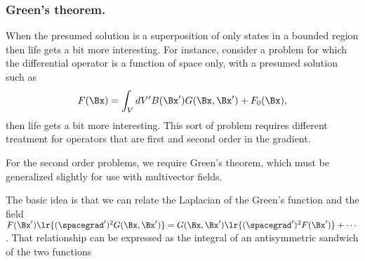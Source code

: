 \subsubsection{Green's theorem.}

When the presumed solution is a superposition of only states in a bounded region
then life gets a bit more interesting.  For instance, consider a problem for which the differential operator is a function of space only, with a presumed solution such as
\begin{equation}\label{eqn:greensFunctionSolutions:200}
F(\Bx) = \int_V dV' B(\Bx') G(\Bx, \Bx') + F_0(\Bx),
\end{equation}
then life gets a bit more interesting.
This sort of problem requires different treatment for operators that are first and second order in the gradient.

For the second order problems, we require Green's theorem, which must be generalized slightly for use with multivector fields.

The basic idea is that we can relate the Laplacian of the Green's function and the field
\( F(\Bx') \lr{ (\spacegrad')^2 G(\Bx, \Bx') } = G(\Bx, \Bx') \lr{ (\spacegrad')^2 F(\Bx')} + \cdots \).
That relationship can be expressed as the integral of an antisymmetric sandwich of the two functions


